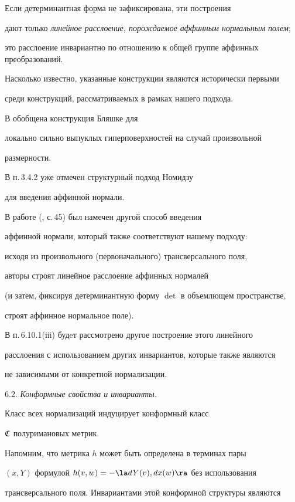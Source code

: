 Если детерминантная форма не зафиксирована, эти построения

дают только {\it линейное расслоение, порождаемое аффинным нормальным полем};

это расслоение инвариантно по отношению к общей группе аффинных преобразований.

Насколько известно, указанные конструкции являются исторически первыми

среди конструкций, рассматриваемых в рамках нашего подхода.

В \cite{LEI} обобщена конструкция Бляшке для

локально сильно выпуклых гиперповерхностей на случай произвольной

размерности.



В п.\,3.4.2 уже отмечен структурный подход Номидзу

для введения аффинной нормали.

В работе (\cite{NOM-SA}, с.\,45) был намечен другой способ введения

аффинной нормали, который также соответствуют нашему подходу:

исходя из произвольного (первоначального) трансверсального поля,

авторы строят линейное расслоение аффинных нормалей

(и затем, фиксируя детерминантную форму $\det$ в объемлющем пространстве,

строят аффинное нормальное поле).

В п.\,6.10.1(iii) будeт рассмотрено другое построение этого линейного

расслоения с использованием других инвариантов, которые также являются

не зависимыми от конкретной нормализации.

\smallskip



6.2. {\it Конформные свойства и инварианты.}

Класс всех нормализаций индуцирует конформный класс

$\frak C$ полуримановых метрик.

Напомним, что метрика $h$ может быть определена в терминах пары

$(x,Y)$ формулой $h(v,w)= - \la dY(v),dx(w)\ra$ без использования

трансверсального поля. Инвариантами этой конформной структуры являются



